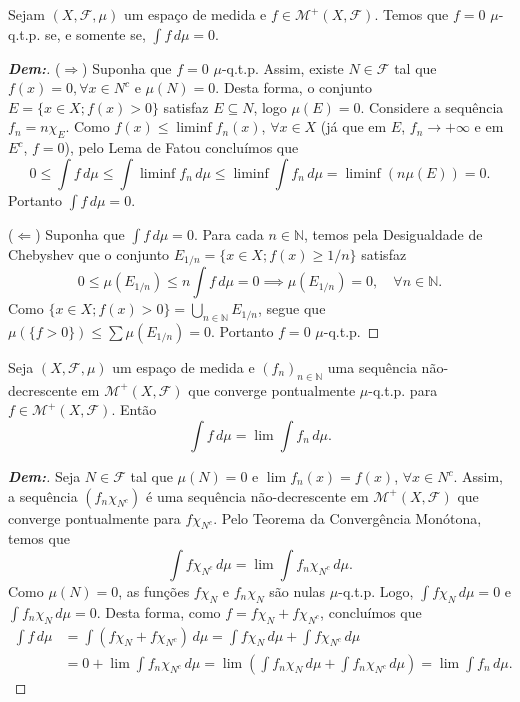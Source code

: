 \begin{corollary*}{}
Sejam $(X, \mathcal{F}, \mu)$ um espaço de medida e $f \in \mathcal{M}^+(X, \mathcal{F})$. Temos que $f = 0$ $\mu$-q.t.p. se, e somente se, $\int f \, d\mu = 0$.
\end{corollary*}

\begin{proof}[\textbf{Dem:}]
($\Rightarrow$) Suponha que $f = 0$ $\mu$-q.t.p. Assim, existe $N \in \mathcal{F}$ tal que $f(x) = 0, \forall x \in N^c$ e $\mu(N) = 0$.
Desta forma, o conjunto $E = \{x \in X ; f(x) > 0\}$ satisfaz $E \subseteq N$, logo $\mu(E) = 0$.
Considere a sequência $f_n = n \chi_E$. Como $f(x) \le \liminf f_n(x)$, $\forall x \in X$ (já que em $E$, $f_n \to +\infty$ e em $E^c$, $f=0$), pelo Lema de Fatou concluímos que
$$ 0 \le \int f \, d\mu \le \int \liminf f_n \, d\mu \le \liminf \int f_n \, d\mu = \liminf (n \mu(E)) = 0. $$
Portanto $\int f \, d\mu = 0$.

($\Leftarrow$) Suponha que $\int f \, d\mu = 0$. Para cada $n \in \mathbb{N}$, temos pela Desigualdade de Chebyshev que o conjunto $E_{1/n} = \{x \in X ; f(x) \ge 1/n\}$ satisfaz
$$ 0 \le \mu(E_{1/n}) \le n \int f \, d\mu = 0 \implies \mu(E_{1/n}) = 0, \quad \forall n \in \mathbb{N}. $$
Como $\{x \in X ; f(x) > 0\} = \bigcup_{n \in \mathbb{N}} E_{1/n}$, segue que $\mu(\{f > 0\}) \le \sum \mu(E_{1/n}) = 0$. Portanto $f = 0$ $\mu$-q.t.p.
\end{proof}

\begin{corollary*}{}
Seja $(X, \mathcal{F}, \mu)$ um espaço de medida e $(f_n)_{n \in \mathbb{N}}$ uma sequência não-decrescente em $\mathcal{M}^+(X, \mathcal{F})$ que converge pontualmente $\mu$-q.t.p. para $f \in \mathcal{M}^+(X, \mathcal{F})$. Então $$\int f \, d\mu = \lim \int f_n \, d\mu.$$
\end{corollary*}

\begin{proof}[\textbf{Dem:}]
Seja $N \in \mathcal{F}$ tal que $\mu(N) = 0$ e $\lim f_n(x) = f(x)$, $\forall x \in N^c$. 
Assim, a sequência $(f_n \chi_{N^c})$ é uma sequência não-decrescente em $\mathcal{M}^+(X, \mathcal{F})$ que converge pontualmente para $f \chi_{N^c}$. 
Pelo Teorema da Convergência Monótona, temos que
$$ \int f \chi_{N^c} \, d\mu = \lim \int f_n \chi_{N^c} \, d\mu. $$
Como $\mu(N) = 0$, as funções $f \chi_N$ e $f_n \chi_N$ são nulas $\mu$-q.t.p. Logo, $\int f \chi_N \, d\mu = 0$ e $\int f_n \chi_N \, d\mu = 0$.
Desta forma, como $f = f \chi_N + f \chi_{N^c}$, concluímos que
\begin{align*}
    \int f \, d\mu &= \int (f \chi_N + f \chi_{N^c}) \, d\mu = \int f \chi_N \, d\mu + \int f \chi_{N^c} \, d\mu \\
    &= 0 + \lim \int f_n \chi_{N^c} \, d\mu = \lim \left( \int f_n \chi_N \, d\mu + \int f_n \chi_{N^c} \, d\mu \right) = \lim \int f_n \, d\mu.
\end{align*}
\end{proof}

